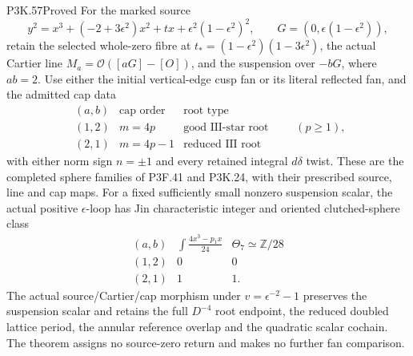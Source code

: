 \begin{statement}{P3K.57}{Proved}
For the marked source
\[
 y^2=x^3+(-2+3\epsilon^2)x^2+t x
       +\epsilon^2(1-\epsilon^2)^2,\qquad
 G=(0,\epsilon(1-\epsilon^2)),
\]
retain the selected whole-zero fibre at
\(t_*=(1-\epsilon^2)(1-3\epsilon^2)\), the actual Cartier line
\(M_a=\mathcal O([aG]-[O])\), and the suspension over \(-bG\),
where \(ab=2\). Use either the initial vertical-edge cusp fan or its
literal reflected fan, and the admitted cap data
\[
 \begin{array}{c|c|c}
 (a,b)&\text{cap order}&\text{root type}\\ \hline
 (1,2)&m=4p&\text{good III-star root}\\
 (2,1)&m=4p-1&\text{reduced III root}
 \end{array}\qquad(p\ge1),
\]
with either norm sign \(n=\pm1\) and every retained integral
\(d\delta\) twist. These are the completed sphere families of
P3F.41 and P3K.24, with their prescribed source, line and cap maps.
For a fixed sufficiently small nonzero suspension scalar, the actual
positive \(\epsilon\)-loop has Jin characteristic integer and oriented
clutched-sphere class
\[
 \begin{array}{c|c|c}
 (a,b)&\displaystyle\int\frac{4x^3-p_1x}{24}
       &\Theta_7\simeq\mathbb Z/28\\ \hline
 (1,2)&0&0\\
 (2,1)&1&1.
 \end{array}
\]
The actual source/Cartier/cap morphism under
\(v=\epsilon^{-2}-1\) preserves the suspension scalar and retains
the full \(D^{-4}\) root endpoint, the reduced doubled lattice period,
the annular reference overlap and the quadratic scalar cochain.
The theorem assigns no source-zero return and makes no further fan comparison.
\end{statement}
